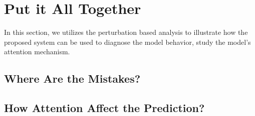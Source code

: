 \section{Put it All Together}

\label{sec:caseStudy}

In this section, we utilizes the perturbation based analysis
to illustrate how the proposed system can be used
to diagnose the model behavior, study the model's attention mechanism.

\subsection{Where Are the Mistakes?}


\subsection{How Attention Affect the Prediction?}


